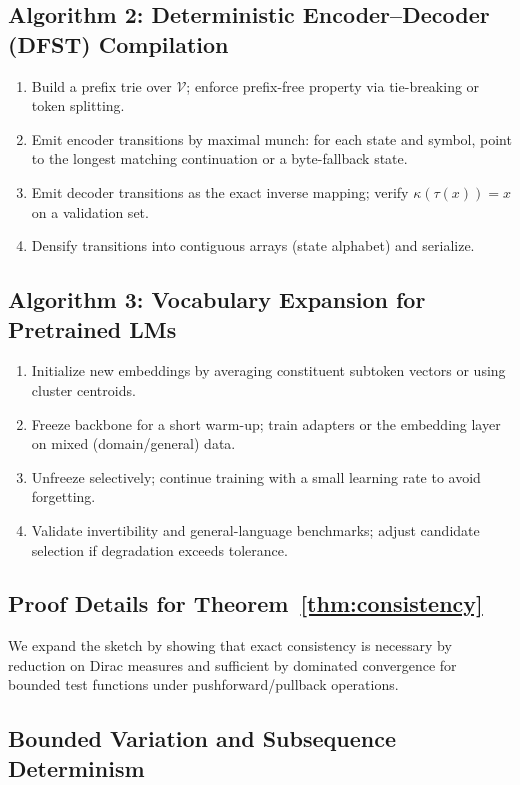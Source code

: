 \subsection{Algorithm 2: Deterministic Encoder--Decoder (DFST) Compilation}
\begin{enumerate}
  \item Build a prefix trie over $\mathcal{V}$; enforce prefix-free property via tie-breaking or token splitting.
  \item Emit encoder transitions by maximal munch: for each state and symbol, point to the longest matching continuation or a byte-fallback state.
  \item Emit decoder transitions as the exact inverse mapping; verify $\kappa(\tau(x))\!=\!x$ on a validation set.
  \item Densify transitions into contiguous arrays (state\,\times\,alphabet) and serialize.
\end{enumerate}

\subsection{Algorithm 3: Vocabulary Expansion for Pretrained LMs}
\begin{enumerate}
  \item Initialize new embeddings by averaging constituent subtoken vectors or using cluster centroids.
  \item Freeze backbone for a short warm-up; train adapters or the embedding layer on mixed (domain/general) data.
  \item Unfreeze selectively; continue training with a small learning rate to avoid forgetting.
  \item Validate invertibility and general-language benchmarks; adjust candidate selection if degradation exceeds tolerance.
\end{enumerate}

\subsection{Proof Details for Theorem~\ref{thm:consistency}}

We expand the sketch by showing that exact consistency is necessary by reduction on Dirac measures and sufficient by dominated convergence for bounded test functions under pushforward/pullback operations.

\subsection{Bounded Variation and Subsequence Determinism}

